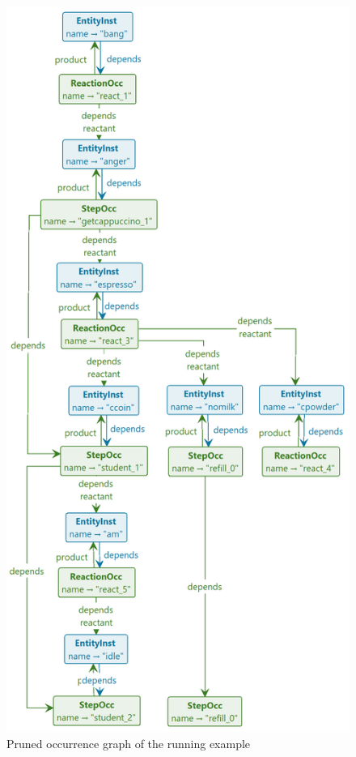 \begin{figure}
\centering
\includegraphics[width=\columnwidth]{figs/toy-pruned}
\caption{Pruned occurrence graph of the running example}
\label{fig:toy-pruned}
\end{figure}

